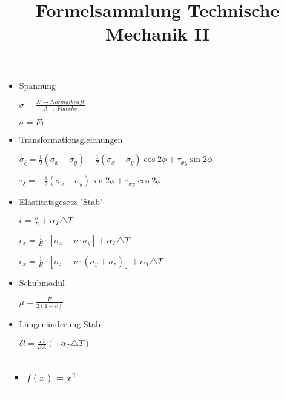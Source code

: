 \documentclass{tudexercise}
\begin{document}
	\title{Formelsammlung Technische Mechanik II}
	\date{}
	\author{}
    \maketitle
\large	
\begin{minipage}[t]{0,47 \textwidth}
	\begin{itemize}
        
        \item{Spannung}
        
        $\sigma = \frac{N \rightarrow Normalkraft}{A \rightarrow Flaeche}$
             
        $\sigma = E \epsilon$
        
        \item{Transformationsgleichungen}
        
        $\sigma_\xi = \frac{1}{2}(\sigma_x + \sigma_y) + \frac{1}{2}(\sigma_x - \sigma_y)\cos2\phi+\tau_{xy}\sin2\phi        
        $
        
        $\tau_{\xi} =           -\frac{1}{2}(\sigma_x - \sigma_y)\sin2\phi+\tau_{xy}\cos2\phi$
        
		\item{Elastit\"atsgesetz "Stab"}
        
        $\epsilon = \frac{\sigma}{E}+\alpha_T\triangle T$
		
		$\epsilon_x = \frac{1}{E}\cdot[\sigma_x - v \cdot \sigma_y] + \alpha_T\triangle T  $
		
    	$	\epsilon_x = \frac{1}{E}\cdot[\sigma_x - v \cdot (\sigma_y + \sigma_z)] + \alpha_T\triangle T  
    	$	

		\item{Schubmodul}
	
		$\mu = \frac{E}{2(1+v)} $

        \item{L\"angen\"anderung Stab}
        
        $\delta l = \frac{Fl}{EA} (+   \alpha_T\triangle T)$

	\end{itemize}
\end{minipage}%
\hfill
\begin{minipage}[t]{0,45 \textwidth}
	\begin{tabular}{|p{\textwidth}}
		\begin{itemize}
			\item $f(x) = x^2$
		\end{itemize}
		
	\end{tabular}
\end{minipage}%
\end{document}
